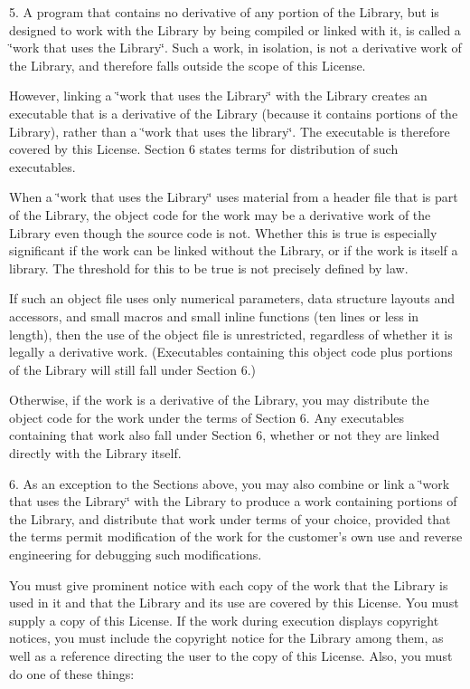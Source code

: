 5. A program that contains no derivative of any portion of the Library, but is designed to work with the Library by being compiled or linked with it, is called a \char`\"{}work that uses the Library\char`\"{}. Such a work, in isolation, is not a derivative work of the Library, and therefore falls outside the scope of this License.

However, linking a \char`\"{}work that uses the Library\char`\"{} with the Library creates an executable that is a derivative of the Library (because it contains portions of the Library), rather than a \char`\"{}work that uses the library\char`\"{}. The executable is therefore covered by this License. Section 6 states terms for distribution of such executables.

When a \char`\"{}work that uses the Library\char`\"{} uses material from a header file that is part of the Library, the object code for the work may be a derivative work of the Library even though the source code is not. Whether this is true is especially significant if the work can be linked without the Library, or if the work is itself a library. The threshold for this to be true is not precisely defined by law.

If such an object file uses only numerical parameters, data structure layouts and accessors, and small macros and small inline functions (ten lines or less in length), then the use of the object file is unrestricted, regardless of whether it is legally a derivative work. (Executables containing this object code plus portions of the Library will still fall under Section 6.)

Otherwise, if the work is a derivative of the Library, you may distribute the object code for the work under the terms of Section 6. Any executables containing that work also fall under Section 6, whether or not they are linked directly with the Library itself.

6. As an exception to the Sections above, you may also combine or link a \char`\"{}work that uses the Library\char`\"{} with the Library to produce a work containing portions of the Library, and distribute that work under terms of your choice, provided that the terms permit modification of the work for the customer's own use and reverse engineering for debugging such modifications.

You must give prominent notice with each copy of the work that the Library is used in it and that the Library and its use are covered by this License. You must supply a copy of this License. If the work during execution displays copyright notices, you must include the copyright notice for the Library among them, as well as a reference directing the user to the copy of this License. Also, you must do one of these things:

